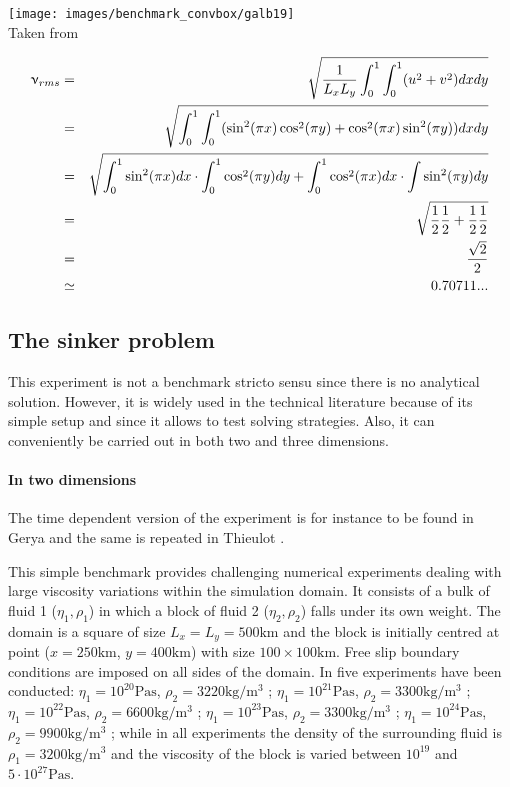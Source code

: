 \begin{center}
\texttt{[image: images/benchmark\_convbox/galb19]}\\
{\captionfont Taken from \cite{galb19}}
\end{center}

\begin{eqnarray}
\upnu_{rms} 
&=& \sqrt{\frac{1}{L_xL_y} \int_0^1 \int_0^1 (u^2+v^2) dxdy} \nonumber\\
&=& \sqrt{\int_0^1 \int_0^1 ( \sin^2 (\pi x) \cos^2 (\pi y) + \cos^2 (\pi x) \sin^2 (\pi y) ) dxdy} \nonumber\\
&=& \sqrt{ \int_0^1 \sin^2 (\pi x) dx  \cdot \int_0^1 \cos^2 (\pi y) dy + \int_0^1 \cos^2 (\pi x) dx \cdot \int \sin^2 (\pi y) dy } \nonumber\\
&=& \sqrt{\frac{1}{2} \frac{1}{2}+ \frac{1}{2} \frac{1}{2} }\nonumber\\
&=& \frac{\sqrt{2}}{2} \nonumber\\
&\simeq& 0.70711...
\end{eqnarray}


\subsection{The sinker problem}\label{sec:sinker}

This experiment is not a benchmark stricto sensu since there is no analytical solution. However, it is widely used in the technical literature because of its simple setup and since it allows to test solving strategies.
Also, it can conveniently be carried out in both two and three dimensions.

\paragraph{In two dimensions} The time dependent version of the experiment is for instance to be found 
in Gerya \cite{gery10} and the same is repeated in Thieulot \cite{thie11}.

This simple benchmark provides challenging numerical experiments 
dealing with large viscosity variations within the simulation
domain. It consists of a bulk of fluid 1 ($\eta_1,\rho_1$) 
in which a block of fluid 2 ($\eta_2,\rho_2$) falls under its own
weight. The domain is a square of size $L_x = L_y = 500\si{\kilo\metre}$ and the
block is initially centred at point ($x=250\si{\km}$, $y=400\si{\km}$) with size
$100 \times 100\si{\km}$.
Free slip boundary conditions are imposed on all sides of the domain. 
In \cite{thie11} five experiments have been conducted:
$\eta_1 = 10^{20}\si{\pascal\second}$, $\rho_2=3220\si{\kg\per\cubic\metre}$ ;
$\eta_1 = 10^{21}\si{\pascal\second}$, $\rho_2=3300\si{\kg\per\cubic\metre}$ ;
$\eta_1 = 10^{22}\si{\pascal\second}$, $\rho_2=6600\si{\kg\per\cubic\metre}$ ;
$\eta_1 = 10^{23}\si{\pascal\second}$, $\rho_2=3300\si{\kg\per\cubic\metre}$ ;
$\eta_1 = 10^{24}\si{\pascal\second}$, $\rho_2=9900\si{\kg\per\cubic\metre}$ ;
while in all experiments the density of the surrounding fluid is
$\rho_1=3200\si{\kg\per\cubic\metre}$ and the viscosity of the block is varied between
$10^{19}$ and $5\cdot10^{27}\si{\pascal\second}$.


